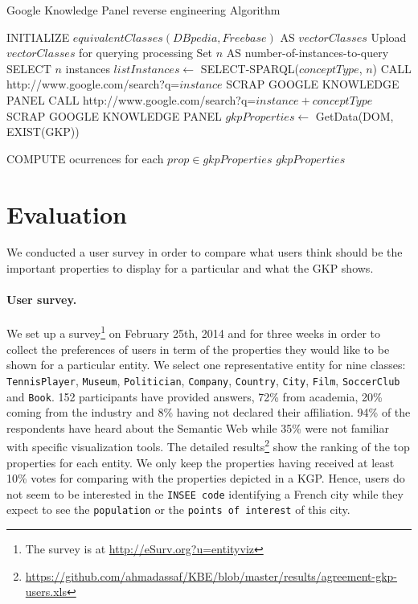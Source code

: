\documentclass[runningheads,a4paper]{llncs}
\begin{document}
\begin{algorithm}[h]\scriptsize
\caption{Google Knowledge Panel reverse engineering Algorithm} \label{algoscrapping}
\begin{algorithmic}[1]
    \STATE INITIALIZE $equivalentClasses(DBpedia,Freebase) $ AS $vectorClasses$
    \STATE Upload $vectorClasses$ for querying processing
    \STATE Set $n$ AS number-of-instances-to-query
	\STATE SELECT $n$ instances
	\STATE $listInstances \leftarrow$ SELECT-SPARQL($conceptType$, $n$)
			\STATE CALL http://www.google.com/search?q=$instance$
				\STATE SCRAP GOOGLE KNOWLEDGE PANEL
			\ELSE
				\STATE CALL http://www.google.com/search?q=$instance + conceptType$
 				\STATE SCRAP GOOGLE KNOWLEDGE PANEL
			\ENDIF
			\STATE $gkpProperties \leftarrow$ GetData(DOM, EXIST(GKP))
			
		\ENDFOR
	\STATE COMPUTE ocurrences for each $prop \in gkpProperties$
    \ENDFOR
    \RETURN $gkpProperties$
\end{algorithmic}
\end{algorithm}
\normalsize


\section{Evaluation}
\label{sec:evaluation}
We conducted a user survey in order to compare what users think should be the important properties to display for a particular and what the GKP shows.

\paragraph{\textbf{User survey.}}
\label{sec:survey}
We set up a survey\footnote{The survey is at \url{http://eSurv.org?u=entityviz}} on February 25th, 2014 and for three weeks in order to collect the preferences of users in term of the properties they would like to be shown for a particular entity. We select one representative entity for nine classes: \texttt{TennisPlayer}, \texttt{Museum}, \texttt{Politician}, \texttt{Company}, \texttt{Country}, \texttt{City}, \texttt{Film}, \texttt{SoccerClub} and \texttt{Book}. 152 participants have provided answers, 72\% from academia, 20\% coming from the industry and 8\% having not declared their affiliation. 94\% of the respondents have heard about the Semantic Web while 35\% were not familiar with specific visualization tools. The detailed results\footnote{\url{https://github.com/ahmadassaf/KBE/blob/master/results/agreement-gkp-users.xls}} show the ranking of the top properties for each entity. We only keep the properties having received at least 10\% votes for comparing with the properties depicted in a KGP. Hence, users do not seem to be interested in the \texttt{INSEE code} identifying a French city while they expect to see the \texttt{population} or the \texttt{points of interest} of this city.
\end{document}
